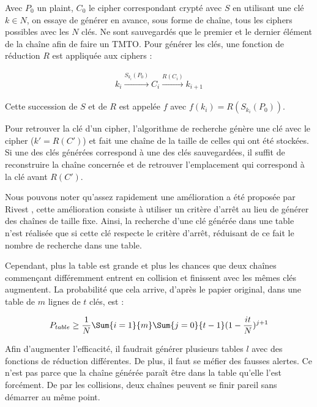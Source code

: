 
		Avec $P_0$ un \gls{plaint}, $C_0$ le \gls{cipher} correspondant crypté avec $S$ en utilisant une clé $k \in N$, on essaye de générer en avance, sous forme de chaîne, tous les \glspl{cipher} possibles avec les $N$ clés. Ne sont sauvegardés que le premier et le dernier élément de la chaîne afin de faire un \gls{TMTO}. Pour générer les clés, une fonction de réduction $R$ est appliquée aux \glspl{cipher} :

		\begin{align*}
			k_i \overset{S_{k_i}(P_0)}{\longrightarrow} C_i \overset{R(C_i)}{\longrightarrow} k_{i+1}
		\end{align*}

		Cette succession de $S$ et de $R$ est appelée $f$ avec $f(k_i) = R(S_{k_i}(P_0))$.

		\bigskip

		Pour retrouver la clé d'un \gls{cipher}, l'algorithme de recherche génère une clé avec le \gls{cipher} ($k' = R(C')$) et fait une chaîne de la taille de celles qui ont été stockées. Si une des clés générées correspond à une des clés sauvegardées, il suffit de reconstruire la chaîne concernée et de retrouver l'emplacement qui correspond à la clé avant $R(C')$.


		Nous pouvons noter qu'assez rapidement une amélioration a été proposée par Rivest \cite{Rivest}, cette amélioration consiste à utiliser un critère d'arrêt au lieu de générer des chaînes de taille fixe. Ainsi, la recherche d'une clé générée dans une table n'est réalisée que si cette clé respecte le critère d'arrêt, réduisant de ce fait le nombre de recherche dans une table.

		\bigskip

		Cependant, plus la table est grande et plus les chances que deux chaînes commençant différemment entrent en collision et finissent avec les mêmes clés augmentent. La probabilité que cela arrive, d'après le papier original\cite{ehellman}, dans une table de $m$ lignes de $t$ clés, est :

		\bigskip

		\begin{align*}
			P_{table} \ge{} \frac{1}{N} \Sum{i=1}{m}\Sum{j=0}{t-1} (1 - \frac{it}{N})^{j+1}
		\end{align*}

		\bigskip

		Afin d'augmenter l'efficacité, il faudrait générer plusieurs tables $l$ avec des fonctions de réduction différentes. De plus, il faut se méfier des fausses alertes. Ce n'est pas parce que la chaîne générée paraît être dans la table qu'elle l'est forcément. De par les collisions, deux chaînes peuvent se finir pareil sans démarrer au même point.

